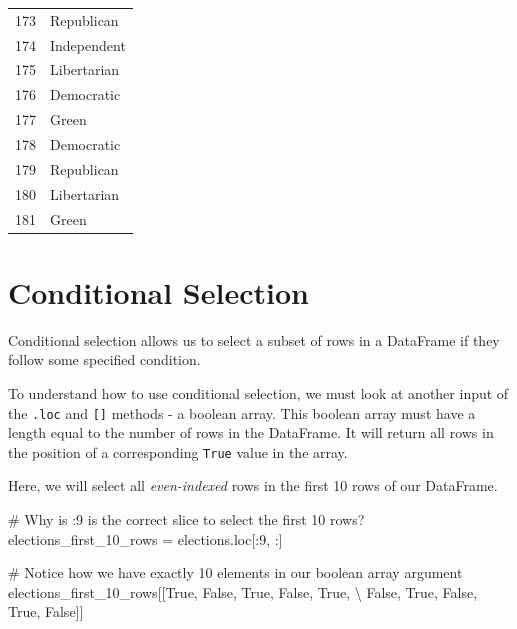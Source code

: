 \documentclass[
  letterpaper,
  DIV=11,
  numbers=noendperiod]{scrreprt}
\newenvironment{Shaded}{\begin{snugshade}}{\end{snugshade}}
\newcommand{\CommentTok}[1]{\textcolor[rgb]{0.37,0.37,0.37}{#1}}
\newcommand{\DecValTok}[1]{\textcolor[rgb]{0.68,0.00,0.00}{#1}}
\newcommand{\NormalTok}[1]{\textcolor[rgb]{0.00,0.23,0.31}{#1}}
\newcommand{\OperatorTok}[1]{\textcolor[rgb]{0.37,0.37,0.37}{#1}}
\newcommand{\VariableTok}[1]{\textcolor[rgb]{0.07,0.07,0.07}{#1}}
\begin{document}
\begin{tabular}{ll}
173 &             Republican \\
174 &            Independent \\
175 &            Libertarian \\
176 &             Democratic \\
177 &                  Green \\
178 &             Democratic \\
179 &             Republican \\
180 &            Libertarian \\
181 &                  Green \\
\bottomrule
\end{tabular}

\hypertarget{conditional-selection}{%
\section{Conditional Selection}\label{conditional-selection}}

Conditional selection allows us to select a subset of rows in a
DataFrame if they follow some specified condition.

To understand how to use conditional selection, we must look at another
input of the \texttt{.loc} and \texttt{{[}{]}} methods - a boolean
array. This boolean array must have a length equal to the number of rows
in the DataFrame. It will return all rows in the position of a
corresponding \texttt{True} value in the array.

Here, we will select all \emph{even-indexed} rows in the first 10 rows
of our DataFrame.

\begin{Shaded}
\begin{Highlighting}[]
\CommentTok{\# Why is :9 is the correct slice to select the first 10 rows?}
\NormalTok{elections\_first\_10\_rows }\OperatorTok{=}\NormalTok{ elections.loc[:}\DecValTok{9}\NormalTok{, :]}

\CommentTok{\# Notice how we have exactly 10 elements in our boolean array argument}
\NormalTok{elections\_first\_10\_rows[[}\VariableTok{True}\NormalTok{, }\VariableTok{False}\NormalTok{, }\VariableTok{True}\NormalTok{, }\VariableTok{False}\NormalTok{, }\VariableTok{True}\NormalTok{, }\OperatorTok{\textbackslash{}}
                         \VariableTok{False}\NormalTok{, }\VariableTok{True}\NormalTok{, }\VariableTok{False}\NormalTok{, }\VariableTok{True}\NormalTok{, }\VariableTok{False}\NormalTok{]]}
\end{Highlighting}
\end{Shaded}
\end{document}
